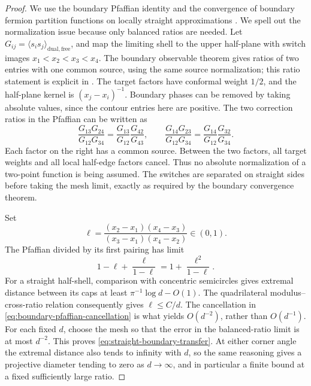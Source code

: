 \begin{proof}
We use the boundary Pfaffian identity and the convergence of boundary
fermion partition functions on locally straight approximations
\cite[Theorem~2.1 and the partition identities in Section~2.1]{Izyurov}.
We spell out the normalization issue because only balanced ratios are
needed. Let $G_{ij}=\langle s_i s_j\rangle_{\mathrm{dual,free}}$,
and map the limiting shell to the upper half-plane with switch images
$x_1<x_2<x_3<x_4$. The boundary observable theorem gives ratios of
two entries with one common source, using the same source normalization;
this ratio statement is explicit in
\cite[Remark~3.19(ii), Equation~(3.13)]{CI}.
The target factors have conformal weight $1/2$, and the half-plane
kernel is $(x_j-x_i)^{-1}$. Boundary phases can be removed by taking
absolute values, since the contour entries here are positive.
The two correction ratios in the Pfaffian
can be written as
\[
 \frac{G_{13}G_{24}}{G_{12}G_{34}}
   =\frac{G_{13}}{G_{12}}\frac{G_{42}}{G_{43}},
 \qquad
 \frac{G_{14}G_{23}}{G_{12}G_{34}}
   =\frac{G_{14}}{G_{12}}\frac{G_{32}}{G_{34}}.
\]
Each factor on the right has a common source. Between the two factors,
all target weights and all local half-edge factors cancel. Thus no
absolute normalization of a two-point function is being assumed.
The switches are separated on straight sides before taking the mesh
limit, exactly as required by the boundary convergence theorem.

Set
\[
 \ell=\frac{(x_2-x_1)(x_4-x_3)}
             {(x_3-x_1)(x_4-x_2)}\in(0,1).
\]
The Pfaffian divided by its first pairing has limit
\begin{equation}
              1-\ell+\frac{\ell}{1-\ell}
                =1+\frac{\ell^2}{1-\ell}.
 \label{eq:boundary-pfaffian-cancellation}
\end{equation}
For a straight half-shell, comparison with concentric semicircles
gives extremal distance between its caps at least
$\pi^{-1}\log d-O(1)$. The quadrilateral modulus--cross-ratio
relation consequently gives $\ell\le C/d$. The cancellation in
\eqref{eq:boundary-pfaffian-cancellation} is what yields
$O(d^{-2})$, rather than $O(d^{-1})$. For each fixed $d$, choose the
mesh so that the error in the balanced-ratio limit is at most $d^{-2}$.
This proves \eqref{eq:straight-boundary-transfer}. At either corner
angle the extremal distance also tends to infinity with $d$, so the
same reasoning gives a projective diameter tending to zero as
$d\to\infty$, and in particular a finite bound at a fixed sufficiently
large ratio.


\end{proof}
